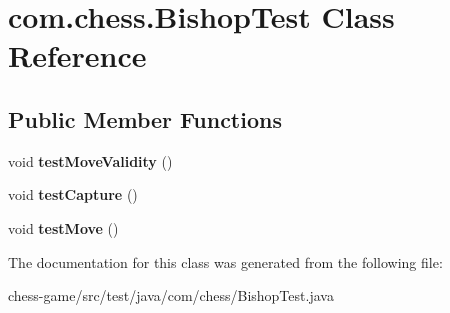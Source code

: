 \hypertarget{classcom_1_1chess_1_1_bishop_test}{}\section{com.\+chess.\+Bishop\+Test Class Reference}
\label{classcom_1_1chess_1_1_bishop_test}
\subsection*{Public Member Functions}
\begin{DoxyCompactItemize}
\item 
\mbox{\label{classcom_1_1chess_1_1_bishop_test_a12cbf2666da93e1c8fdd60ce7d74ee05}} 
void {\bfseries test\+Move\+Validity} ()
\item 
\mbox{\label{classcom_1_1chess_1_1_bishop_test_a70e4c7ec33faf3ccb7ddfe9606bca500}} 
void {\bfseries test\+Capture} ()
\item 
\mbox{\label{classcom_1_1chess_1_1_bishop_test_aa9f1412450e3c042436786d6a5c662d0}} 
void {\bfseries test\+Move} ()
\end{DoxyCompactItemize}


The documentation for this class was generated from the following file\+:\begin{DoxyCompactItemize}
\item 
chess-\/game/src/test/java/com/chess/Bishop\+Test.\+java\end{DoxyCompactItemize}
